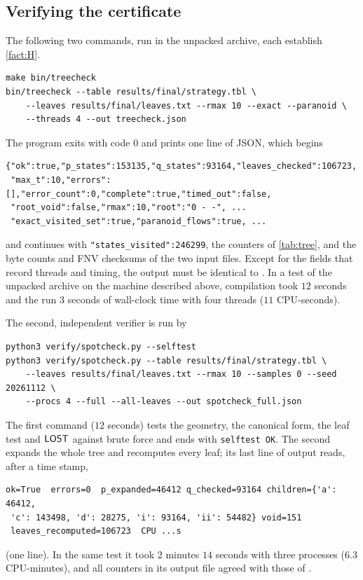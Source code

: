 \subsection{Verifying the certificate}\label{ssec:certifying}

The following two commands, run in the unpacked archive, each establish \cref{fact:H}.
{\small
\begin{verbatim}
make bin/treecheck
bin/treecheck --table results/final/strategy.tbl \
    --leaves results/final/leaves.txt --rmax 10 --exact --paranoid \
    --threads 4 --out treecheck.json
\end{verbatim}
}
\noindent The program exits with code $0$ and prints one line of JSON, which begins
{\small
\begin{verbatim}
{"ok":true,"p_states":153135,"q_states":93164,"leaves_checked":106723,
 "max_t":10,"errors":[],"error_count":0,"complete":true,"timed_out":false,
 "root_void":false,"rmax":10,"root":"0 - -", ...
 "exact_visited_set":true,"paranoid_flows":true, ...
\end{verbatim}
}
\noindent and continues with \texttt{"states\_visited":246299}, the counters of \cref{tab:tree}, and the byte counts
and FNV checksums of the two input files. Except for the fields that record threads and timing, the output
must be identical to \fn{results/final/treecheck.json}. In a test of the unpacked archive on the machine
described above, compilation took $12$ seconds and the run $3$ seconds of wall-clock time with four threads
($11$ CPU-seconds).

The second, independent verifier is run by
{\small
\begin{verbatim}
python3 verify/spotcheck.py --selftest
python3 verify/spotcheck.py --table results/final/strategy.tbl \
    --leaves results/final/leaves.txt --rmax 10 --samples 0 --seed 20261112 \
    --procs 4 --full --all-leaves --out spotcheck_full.json
\end{verbatim}
}
\noindent The first command ($12$ seconds) tests the geometry, the canonical form, the leaf test and $\mathsf{LOST}$ against
brute force and ends with \texttt{selftest OK}. The second expands the whole tree and recomputes every leaf;
its last line of output reads, after a time stamp,
{\small
\begin{verbatim}
ok=True  errors=0  p_expanded=46412 q_checked=93164 children={'a': 46412,
 'c': 143498, 'd': 28275, 'i': 93164, 'ii': 54482} void=151
 leaves_recomputed=106723  CPU ...s
\end{verbatim}
}
\noindent(one line). In the same test it took $2$ minutes $14$ seconds with three processes ($6.3$
CPU-minutes), and all counters in its output file agreed with those of
.

